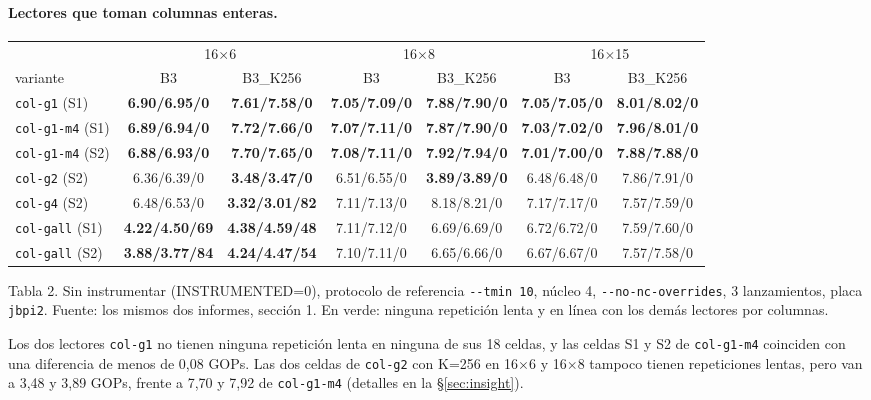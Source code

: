 \documentclass[10pt,a4paper]{article}
\newcommand{\good}[1]{\textcolor{green!45!black}{\textbf{#1}}}
\newcommand{\bad}[1]{\textcolor{red!70!black}{\textbf{#1}}}
\begin{document}
\paragraph{Lectores que toman columnas enteras.}
\begin{center}\footnotesize\setlength{\tabcolsep}{2.8pt}
\begin{tabular}{@{}lcccccc@{}}
\toprule
 & \multicolumn{2}{c}{16$\times$6} & \multicolumn{2}{c}{16$\times$8} & \multicolumn{2}{c}{16$\times$15} \\
\cmidrule(lr){2-3}\cmidrule(lr){4-5}\cmidrule(lr){6-7}
variante & B3 & B3\_K256 & B3 & B3\_K256 & B3 & B3\_K256 \\
\midrule
\texttt{col-g1} (S1) & \good{6.90/6.95/0} & \good{7.61/7.58/0} & \good{7.05/7.09/0} & \good{7.88/7.90/0} & \good{7.05/7.05/0} & \good{8.01/8.02/0} \\
\texttt{col-g1-m4} (S1) & \good{6.89/6.94/0} & \good{7.72/7.66/0} & \good{7.07/7.11/0} & \good{7.87/7.90/0} & \good{7.03/7.02/0} & \good{7.96/8.01/0} \\
\texttt{col-g1-m4} (S2) & \good{6.88/6.93/0} & \good{7.70/7.65/0} & \good{7.08/7.11/0} & \good{7.92/7.94/0} & \good{7.01/7.00/0} & \good{7.88/7.88/0} \\
\texttt{col-g2} (S2) & 6.36/6.39/0 & \bad{3.48/3.47/0} & 6.51/6.55/0 & \bad{3.89/3.89/0} & 6.48/6.48/0 & 7.86/7.91/0 \\
\texttt{col-g4} (S2) & 6.48/6.53/0 & \bad{3.32/3.01/82} & 7.11/7.13/0 & 8.18/8.21/0 & 7.17/7.17/0 & 7.57/7.59/0 \\
\texttt{col-gall} (S1) & \bad{4.22/4.50/69} & \bad{4.38/4.59/48} & 7.11/7.12/0 & 6.69/6.69/0 & 6.72/6.72/0 & 7.59/7.60/0 \\
\texttt{col-gall} (S2) & \bad{3.88/3.77/84} & \bad{4.24/4.47/54} & 7.10/7.11/0 & 6.65/6.66/0 & 6.67/6.67/0 & 7.57/7.58/0 \\
\bottomrule
\end{tabular}
\end{center}
{\footnotesize Tabla 2. Sin instrumentar (INSTRUMENTED=0), protocolo de referencia \texttt{-{}-tmin 10}, núcleo 4,
\texttt{-{}-no-nc-overrides}, 3 lanzamientos, placa \texttt{jbpi2}. Fuente: los mismos dos informes, sección 1. En verde: ninguna
repetición lenta y en línea con los demás lectores por columnas.}

Los dos lectores \texttt{col-g1} no tienen ninguna repetición lenta en ninguna de sus 18 celdas, y las celdas S1 y S2 de
\texttt{col-g1-m4} coinciden con una diferencia de menos de 0,08 GOPs. Las dos celdas de \texttt{col-g2} con K=256 en 16$\times$6 y
16$\times$8 tampoco tienen repeticiones lentas, pero van a 3,48 y 3,89 GOPs, frente a 7,70 y 7,92 de \texttt{col-g1-m4} (detalles en
la \S\ref{sec:insight}).
\end{document}
